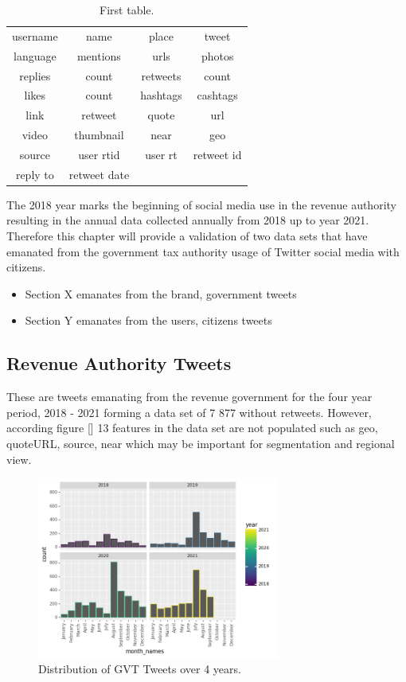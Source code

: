 \begin{table}
\centering
\begin{tabular}{ |c|c|c|c|}
 \hline
 username & name & place &tweet\\
 language & mentions & urls & photos\\
 replies & count & retweets & count\\
 likes & count & hashtags & cashtags\\
 link & retweet & quote & url\\
 video & thumbnail & near & geo\\
 source & user rtid & user rt & retweet id\\
 reply to & retweet date\\
 \hline
 \end{tabular}
\caption{First table.}
\label{tab:table1}
\end{table}

The 2018 year marks the beginning of social media use in the revenue authority resulting in the annual data collected annually from 2018 up to year 2021. Therefore this chapter will provide a validation of two data sets that have emanated from the government tax authority usage of Twitter social media with citizens. 

\begin{itemize}
    \item Section X emanates from the brand, government tweets
    
    \item Section Y emanates from the users, citizens tweets
\end{itemize}

\subsection{Revenue Authority Tweets} 
These are tweets emanating from the revenue government for the four year period, 2018 - 2021 forming a data set of 7 877 without retweets.  However, according figure [] 13 features in the data set are not populated such as geo, quoteURL, source, near which may be important for segmentation and regional view. 

\begin{figure}[h!]
\centering
\includegraphics[width=8cm]{postgrad_template 2/Images/Gvt dataset four the four years distribution.png}
\caption{Distribution of GVT Tweets over 4 years.}
\label{fig:figure1}
\end{figure}

